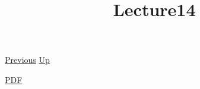 \documentclass[12pt,a4paper]{report}
\begin{document}
 \href{doc/phil/People/Brandom/Antirepresentationalism/Lecture13.html}{Previous} 
 \href{doc/phil/People/Brandom/Antirepresentationalism.html}{Up} 

 \href{doc/phil/People/Brandom/Antirepresentationalism/Lecture14.pdf}{PDF} 
\title{Lecture14}

\tableofcontents
\end{document}

